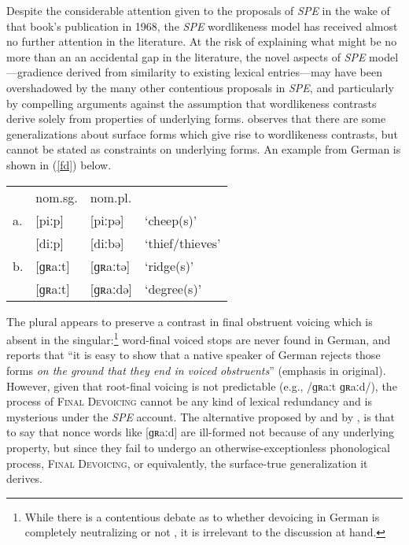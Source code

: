 Despite the considerable attention given to the proposals of \emph{SPE} in the wake of that book's publication in 1968, the \emph{SPE} wordlikeness model has received almost no further attention in the literature. At the risk of explaining what might be no more than an an accidental gap in the literature, the novel aspects of \emph{SPE} model---gradience derived from similarity to existing lexical entries---may have been overshadowed by the many other contentious proposals in \emph{SPE}, and particularly by compelling arguments against the assumption that wordlikeness contrasts derive solely from properties of underlying forms. \citet{Shibatani1973} observes that there are some generalizations about surface forms which give rise to wordlikeness contrasts, but cannot be stated as constraints on underlying forms. An example from German is shown in (\ref{fd}) below.

\begin{example} 
\label{fd}
\begin{tabular}{l l l l}
   & nom.sg. & nom.pl.    \\
a. & [piːp]    & [piːpə]  & `cheep(s)'      \\
   & [diːp]    & [diːbə]  & `thief/thieves' \\
b. & [ɡʀaːt]   & [ɡʀaːtə] & `ridge(s)'      \\
   & [ɡʀaːt]   & [ɡʀaːdə] & `degree(s)'     \\
\end{tabular}
\end{example}

\noindent The plural appears to preserve a contrast in final obstruent voicing which is absent in the singular:\footnote{While there is a contentious debate as to whether devoicing in German is completely neutralizing \citep[e.g.,][]{Fourakis1984} or not \citep[e.g.,][]{Port1985}, it is irrelevant to the discussion at hand.} word-final voiced stops are never found in German, and \citet[95]{Shibatani1973} reports that ``it is easy to show that a native speaker of German rejects those forms \emph{on the ground that they end in voiced obstruents}'' (emphasis in original). However, given that root-final voicing is not predictable (e.g., /ɡʀaːt \alt{} ɡʀaːd/), the process of \textsc{Final Devoicing} cannot be any kind of lexical redundancy and is mysterious under the \emph{SPE} account. The alternative proposed by \citeauthor{Shibatani1973} and by \citet{Clayton1976}, is that to say that nonce words like [ɡʀaːd] are ill-formed not because of any underlying property, but since they fail to undergo an otherwise-exceptionless phonological process, \textsc{Final Devoicing}, or equivalently, the surface-true generalization it derives.


